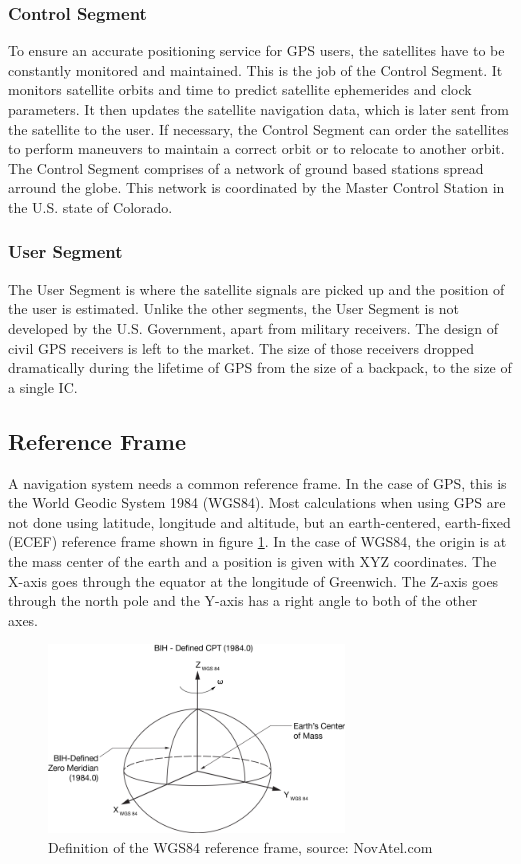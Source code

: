 \subsubsection{Control Segment}

To ensure an accurate positioning service for GPS users, the satellites have to be constantly monitored and maintained.
This is the job of the Control Segment.
It monitors satellite orbits and time to predict satellite ephemerides and clock parameters.
It then updates the satellite navigation data, which is later sent from the satellite to the user.
If necessary, the Control Segment can order the satellites to perform maneuvers to maintain a correct orbit or to relocate to another orbit.
The Control Segment comprises of a network of ground based stations spread arround the globe.
This network is coordinated by the Master Control Station in the U.S. state of Colorado.

\subsubsection{User Segment}

The User Segment is where the satellite signals are picked up and the position of the user is estimated.
Unlike the other segments, the User Segment is not developed by the U.S. Government, apart from military receivers.
The design of civil GPS receivers is left to the market.
The size of those receivers dropped dramatically during the lifetime of GPS from the size of a backpack, to the size of a single IC.

\subsection{Reference Frame}

A navigation system needs a common reference frame.
In the case of GPS, this is the World Geodic System 1984 (WGS84).
Most calculations when using GPS are not done using latitude, longitude and altitude, but an earth-centered, earth-fixed (ECEF) reference frame shown in figure \ref{fig:wgs84}.
In the case of WGS84, the origin is at the mass center of the earth and a position is given with XYZ coordinates.
The X-axis goes through the equator at the longitude of Greenwich.
The Z-axis goes through the north pole and the Y-axis has a right angle to both of the other axes.

\begin{figure}[ht]
 \centering
 \includegraphics[width=0.7\textwidth]{images/WGS84.png}
 \caption{Definition of the WGS84 reference frame, source: NovAtel.com}
 \label{fig:wgs84}
\end{figure}


